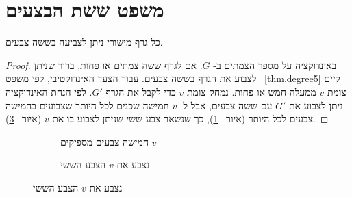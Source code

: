 \section{משפט ששת הבצעים}\label{s.six-color}

\begin{theorem}\label{thm.sixcolor}
כל גרף מישורי ניתן לצביעה בששה צבעים.
\end{theorem}

\begin{proof}
באינדוקציה על מספר הצמתים ב-%
$G$.
אם לגרף ששה צמתים או פחות, ברור שניתן לצבוע את הגרף בששה צבעים. עבור הצעד האינדוקטיבי, לפי משפט
~\ref{thm.degree5}
קיים צומת
$v$
ממעלה חמש או פחות. נמחק צומת
$v$
כדי לקבל את הגרף
$G'$.
לפי הנחת האינדוקציה ניתן לצבוע את
$G'$
עם ששה צבעים, אבל ל-%
$v$
חמישה שכנים לכל היותר שצבועים בחמישה צבעים לכל היותר
(איור~%
\ref{f.five-six-five}),
כך שנשאר צבע ששי שניתן לצבוע בו את
$v$
(איור~%
\ref{f.five-six-six}).
\end{proof}

\begin{figure}[tb]
\begin{center}
\begin{subfigure}{.4\textwidth}\centering
{}
\caption{חמישה צבעים מספיקים
$v$}\label{f.five-six-five}
\end{subfigure}
\hspace{3em}
\begin{subfigure}{.4\textwidth}\centering
{}
\caption{נצבע את
$v$
הצבע הששי}
\label{f.five-six-six}
\end{subfigure}
\end{center}
\end{figure}

